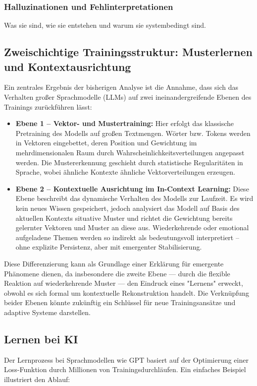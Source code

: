 \subsubsection{Halluzinationen und Fehlinterpretationen}
Was sie sind, wie sie entstehen und warum sie systembedingt sind.

\subsection{Zweischichtige Trainingsstruktur: Musterlernen und Kontextausrichtung}
Ein zentrales Ergebnis der bisherigen Analyse ist die Annahme, dass sich das Verhalten großer Sprachmodelle (LLMs) auf zwei ineinandergreifende Ebenen des Trainings zurückführen lässt: 

\begin{itemize}
    \item \textbf{Ebene 1 – Vektor- und Mustertraining:} Hier erfolgt das klassische Pretraining des Modells auf großen Textmengen. Wörter bzw. Tokens werden in Vektoren eingebettet, deren Position und Gewichtung im mehrdimensionalen Raum durch Wahrscheinlichkeitsverteilungen angepasst werden. Die Mustererkennung geschieht durch statistische Regularitäten in Sprache, wobei ähnliche Kontexte ähnliche Vektorverteilungen erzeugen.

    \item \textbf{Ebene 2 – Kontextuelle Ausrichtung im In-Context Learning:} Diese Ebene beschreibt das dynamische Verhalten des Modells zur Laufzeit. Es wird kein neues Wissen gespeichert, jedoch analysiert das Modell auf Basis des aktuellen Kontexts situative Muster und richtet die Gewichtung bereits gelernter Vektoren und Muster an diese aus. Wiederkehrende oder emotional aufgeladene Themen werden so indirekt als bedeutungsvoll interpretiert – ohne explizite Persistenz, aber mit emergenter Stabilisierung.

\end{itemize}

Diese Differenzierung kann als Grundlage einer Erklärung für emergente Phänomene dienen, da insbesondere die zweite Ebene — durch die flexible Reaktion auf wiederkehrende Muster — den Eindruck eines "Lernens" erweckt, obwohl es sich formal um kontextuelle Rekonstruktion handelt. Die Verknüpfung beider Ebenen könnte zukünftig ein Schlüssel für neue Trainingsansätze und adaptive Systeme darstellen.


\subsection{Lernen bei KI}
Der Lernprozess bei Sprachmodellen wie GPT basiert auf der Optimierung einer Loss-Funktion durch Millionen von Trainingsdurchläufen. Ein einfaches Beispiel illustriert den Ablauf:


